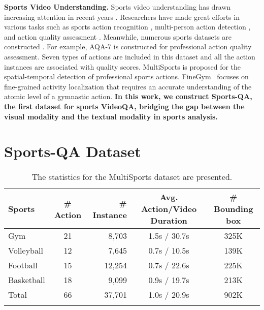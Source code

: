 \noindent\textbf{Sports Video Understanding.} Sports video understanding has drawn increasing attention in recent years \citep{yuan2021spatio,li2021groupformer,koshkina2021contrastive,zhu2022fencenet,martin2020fine,wang2022shuttlenet}. Researchers have made great efforts in various tasks such as sports action recognition \citep{shao2020finegym}, multi-person action detection \citep{li2021multisports}, and action quality assessment \citep{tang2020uncertainty}. Meanwhile, numerous sports datasets are constructed \citep{parmar2019action,li2021multisports,giancola2018soccernet,deliege2021soccernet}.  
For example, AQA-7 \citep{parmar2019action} is constructed for professional action quality assessment. Seven types of actions are included in this dataset and all the action instances are associated with quality scores. 
MultiSports \citep{li2021multisports} is proposed for the spatial-temporal detection of professional sports actions. FineGym~\citep{shao2020finegym} focuses on fine-grained activity localization that requires an accurate understanding of the atomic level of a gymnastic action.
\textbf{In this work, we construct Sports-QA, the first dataset for sports VideoQA, bridging the gap between the visual modality and the textual modality in sports analysis.}

\section{Sports-QA Dataset}

\begin{table}[tbp]
\caption{The statistics for the MultiSports dataset are presented.} 
\label{mss}
\begin{tabular}{@{}lcrcc@{}}
\toprule
 Sports          & \# Action & \# Instance & Avg. Action/Video Duration & \# Bounding box \\ \midrule
Gym        & 21      & 8,703     & 1.5s / 30.7s        & 325K    \\
Volleyball & 12      & 7,645     & 0.7s / 10.5s        & 139K   \\
Football   & 15      & 12,254    & 0.7s / 22.6s        & 225K    \\
Basketball & 18      & 9,099     & 0.9s / 19.7s        & 213K   \\\midrule
Total      & 66      & 37,701    & 1.0s / 20.9s        & 902K   \\ \botrule
\end{tabular}
\end{table}

